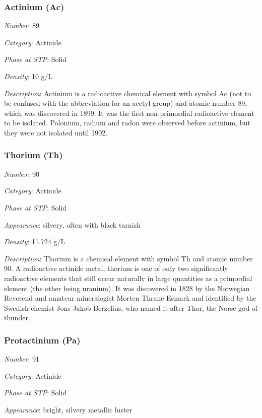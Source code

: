 \documentclass{article}
\begin{document}
\hypertarget{subsubsection::Ac}{}\subsubsection{Actinium (Ac)}

\textit{Number}: 89

\textit{Category}: Actinide

\textit{Phase at STP}: Solid

\textit{Density}: 10 g/L

\textit{Description}: Actinium is a radioactive chemical element with symbol Ac (not to be confused with the abbreviation for an acetyl group) and atomic number 89, which was discovered in 1899. It was the first non-primordial radioactive element to be isolated. Polonium, radium and radon were observed before actinium, but they were not isolated until 1902.

\hypertarget{subsubsection::Th}{}\subsubsection{Thorium (Th)}

\textit{Number}: 90

\textit{Category}: Actinide

\textit{Phase at STP}: Solid

\textit{Appearance}: silvery, often with black tarnish

\textit{Density}: 11.724 g/L

\textit{Description}: Thorium is a chemical element with symbol Th and atomic number 90. A radioactive actinide metal, thorium is one of only two significantly radioactive elements that still occur naturally in large quantities as a primordial element (the other being uranium). It was discovered in 1828 by the Norwegian Reverend and amateur mineralogist Morten Thrane Esmark and identified by the Swedish chemist Jons Jakob Berzelius, who named it after Thor, the Norse god of thunder.

\hypertarget{subsubsection::Pa}{}\subsubsection{Protactinium (Pa)}

\textit{Number}: 91

\textit{Category}: Actinide

\textit{Phase at STP}: Solid

\textit{Appearance}: bright, silvery metallic luster
\end{document}
